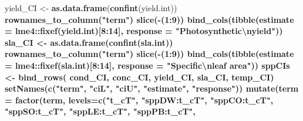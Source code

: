 \documentclass[]{scrartcl}
\newenvironment{Shaded}{\begin{snugshade}}{\end{snugshade}}
\newcommand{\CharTok}[1]{\textcolor[rgb]{0.31,0.60,0.02}{#1}}
\newcommand{\DataTypeTok}[1]{\textcolor[rgb]{0.13,0.29,0.53}{#1}}
\newcommand{\DecValTok}[1]{\textcolor[rgb]{0.00,0.00,0.81}{#1}}
\newcommand{\KeywordTok}[1]{\textcolor[rgb]{0.13,0.29,0.53}{\textbf{#1}}}
\newcommand{\NormalTok}[1]{#1}
\newcommand{\OperatorTok}[1]{\textcolor[rgb]{0.81,0.36,0.00}{\textbf{#1}}}
\newcommand{\StringTok}[1]{\textcolor[rgb]{0.31,0.60,0.02}{#1}}
\begin{document}
\begin{Shaded}
\begin{Highlighting}[]
{{{{{{{{{{{{{{{{{{{{{{\NormalTok{  yield_CI <-}\StringTok{ }\KeywordTok{as.data.frame}\NormalTok{(}\KeywordTok{confint}\NormalTok{(yield.int)) }\OperatorTok{%
\StringTok{                      }\KeywordTok{rownames_to_column}\NormalTok{(}\StringTok{"term"}\NormalTok{) }\OperatorTok{%
\StringTok{                        }\KeywordTok{slice}\NormalTok{(}\OperatorTok{-}\NormalTok{(}\DecValTok{1}\OperatorTok{:}\DecValTok{9}\NormalTok{)) }\OperatorTok{%
\StringTok{                 }\KeywordTok{bind_cols}\NormalTok{(}\KeywordTok{tibble}\NormalTok{(}\DataTypeTok{estimate =}\NormalTok{ lme4}\OperatorTok{::}\KeywordTok{fixef}\NormalTok{(yield.int)[}\DecValTok{8}\OperatorTok{:}\DecValTok{14}\NormalTok{], }
                                  \DataTypeTok{response =} \StringTok{"Photosynthetic}\CharTok{\textbackslash{}n}\StringTok{yield"}\NormalTok{))}
\NormalTok{  sla_CI <-}\StringTok{ }\KeywordTok{as.data.frame}\NormalTok{(}\KeywordTok{confint}\NormalTok{(sla.int)) }\OperatorTok{%
\StringTok{                      }\KeywordTok{rownames_to_column}\NormalTok{(}\StringTok{"term"}\NormalTok{) }\OperatorTok{%
\StringTok{                        }\KeywordTok{slice}\NormalTok{(}\OperatorTok{-}\NormalTok{(}\DecValTok{1}\OperatorTok{:}\DecValTok{9}\NormalTok{)) }\OperatorTok{%
\StringTok{                 }\KeywordTok{bind_cols}\NormalTok{(}\KeywordTok{tibble}\NormalTok{(}\DataTypeTok{estimate =}\NormalTok{ lme4}\OperatorTok{::}\KeywordTok{fixef}\NormalTok{(sla.int)[}\DecValTok{8}\OperatorTok{:}\DecValTok{14}\NormalTok{], }
                                  \DataTypeTok{response =} \StringTok{"Specific}\CharTok{\textbackslash{}n}\StringTok{leaf area"}\NormalTok{))}  
\NormalTok{ sppCIs <-}\StringTok{ }\KeywordTok{bind_rows}\NormalTok{( cond_CI, }
\NormalTok{                      conc_CI, }
\NormalTok{                      yield_CI, }
\NormalTok{                      sla_CI, }
\NormalTok{                      temp_CI) }\OperatorTok{%
\StringTok{           }\KeywordTok{setNames}\NormalTok{(}\KeywordTok{c}\NormalTok{(}\StringTok{"term"}\NormalTok{, }\StringTok{"ciL"}\NormalTok{, }\StringTok{"ciU"}\NormalTok{, }
                      \StringTok{"estimate"}\NormalTok{, }\StringTok{"response"}\NormalTok{)) }\OperatorTok{%
\StringTok{           }\KeywordTok{mutate}\NormalTok{(}\DataTypeTok{term =} \KeywordTok{factor}\NormalTok{(term, }
                 \DataTypeTok{levels=}\KeywordTok{c}\NormalTok{(}\StringTok{"t_cT"}\NormalTok{, }\StringTok{"sppDW:t_cT"}\NormalTok{,}
                          \StringTok{"sppCO:t_cT"}\NormalTok{, }\StringTok{"sppSO:t_cT"}\NormalTok{,}
                          \StringTok{"sppLE:t_cT"}\NormalTok{, }\StringTok{"sppPB:t_cT"}\NormalTok{,}
}}}}}}}}}}}}}}}}}}}}}}}}}}}}}}
\end{Highlighting}
\end{Shaded}
\end{document}
